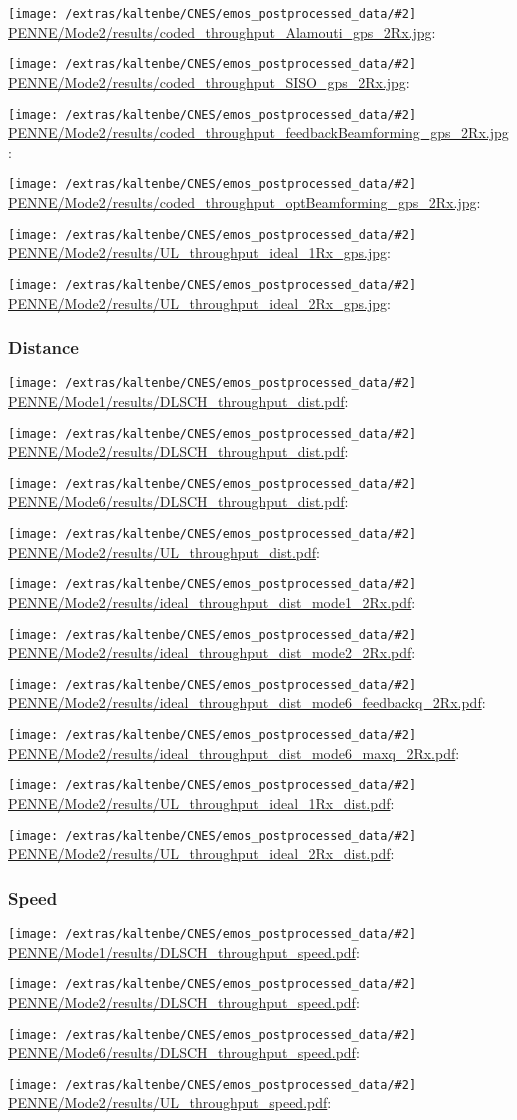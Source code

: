 \documentclass[a4paper,10pt]{article}
\newcommand{\printfile}[2][]{
 \begin{minipage}{8cm}
  \centering
  \texttt{[image: /extras/kaltenbe/CNES/emos\_postprocessed\_data/\#2]}
  \url{#2}: #1

 \end{minipage}
}
\begin{document}
\printfile{PENNE/Mode2/results/coded_throughput_Alamouti_gps_2Rx.jpg}
\printfile{PENNE/Mode2/results/coded_throughput_SISO_gps_2Rx.jpg}

\printfile{PENNE/Mode2/results/coded_throughput_feedbackBeamforming_gps_2Rx.jpg}
\printfile{PENNE/Mode2/results/coded_throughput_optBeamforming_gps_2Rx.jpg}

\printfile{PENNE/Mode2/results/UL_throughput_ideal_1Rx_gps.jpg}
\printfile{PENNE/Mode2/results/UL_throughput_ideal_2Rx_gps.jpg}

\subsubsection{Distance}

\printfile{PENNE/Mode1/results/DLSCH_throughput_dist.pdf}
\printfile{PENNE/Mode2/results/DLSCH_throughput_dist.pdf}

\printfile{PENNE/Mode6/results/DLSCH_throughput_dist.pdf}
\printfile{PENNE/Mode2/results/UL_throughput_dist.pdf}


\printfile{PENNE/Mode2/results/ideal_throughput_dist_mode1_2Rx.pdf}
%
\printfile{PENNE/Mode2/results/ideal_throughput_dist_mode2_2Rx.pdf}

\printfile{PENNE/Mode2/results/ideal_throughput_dist_mode6_feedbackq_2Rx.pdf}
%
\printfile{PENNE/Mode2/results/ideal_throughput_dist_mode6_maxq_2Rx.pdf}

\printfile{PENNE/Mode2/results/UL_throughput_ideal_1Rx_dist.pdf}
\printfile{PENNE/Mode2/results/UL_throughput_ideal_2Rx_dist.pdf}

\subsubsection{Speed}

\printfile{PENNE/Mode1/results/DLSCH_throughput_speed.pdf}
\printfile{PENNE/Mode2/results/DLSCH_throughput_speed.pdf}

\printfile{PENNE/Mode6/results/DLSCH_throughput_speed.pdf}
\printfile{PENNE/Mode2/results/UL_throughput_speed.pdf}
\end{document}
